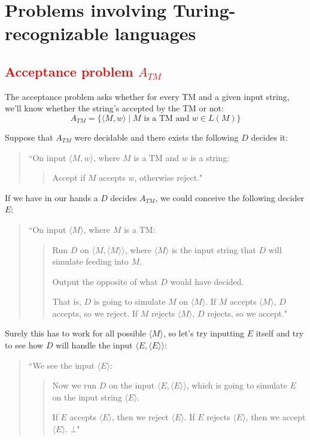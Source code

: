 \documentclass[11pt]{article}
\begin{document}
\newpage
\section{Problems involving Turing-recognizable languages}
\subsection{\textcolor{red}{Acceptance problem $A_{TM}$}}
The acceptance problem asks whether for every TM and a given input string, we'll know whether the string's accepted by the TM or not:
\[A_{TM} = \{\langle M, w \rangle \mid M \text{ is a TM and } w \in L(M)\}\]

Suppose that $A_{TM}$ were decidable and there exists the following $D$ decides it:
\begin{quote}
``On input $\langle M, w \rangle$, where $M$ is a TM and $w$ is a string:
\begin{quote}
Accept if $M$ accepts $w$, otherwise reject."
\end{quote}
\end{quote}

If we have in our hands a $D$ decides $A_{TM}$, we could conceive the following decider $E$:
\begin{quote}
``On input $\langle M \rangle$, where $M$ is a TM:
\begin{quote}
Run $D$ on $\langle M, \langle M \rangle \rangle$, where $\langle M \rangle$ is the input string that $D$ will simulate feeding into $M$.

Output the opposite of what $D$ would have decided.

That is, $D$ is going to simulate $M$ on $\langle M \rangle$. If $M$ accepts $\langle M \rangle$, $D$ accepts, so we reject. If $M$ rejects $\langle M \rangle$, $D$ rejects, so we accept."
\end{quote}
\end{quote}

Surely this has to work for all possible $\langle M \rangle$, so let's try inputting $E$ itself and try to see how $D$ will handle the input $\langle E, \langle E \rangle \rangle$:
\begin{quote}
``We see the input $\langle E \rangle$:
\begin{quote}
Now we run $D$ on the input $\langle E, \langle E \rangle \rangle$, which is going to simulate $E$ on the input string $\langle E \rangle$. 

If $E$ accepts $\langle E \rangle$, then we reject $\langle E \rangle$. If $E$ rejects $\langle E \rangle$, then we accept $\langle E \rangle$. $\bot$"
\end{quote}
\end{quote}
\end{document}
